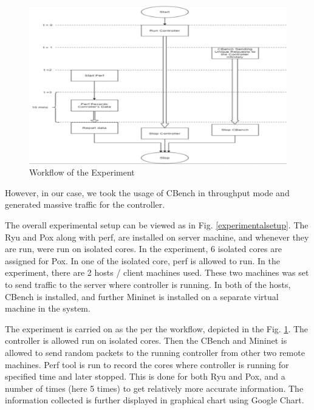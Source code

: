 \begin{figure}[!hbt]
    \centering
        \includegraphics[width=\textwidth,keepaspectratio]{images/Workflow.PNG}
       \caption{Workflow of the Experiment}
        \label{workflowexperiment}
\end{figure}

However, in our case, we took the usage of CBench in throughput mode and generated massive traffic for the controller.

The overall experimental setup can be viewed as in Fig. \ref{experimentalsetup}. The Ryu and Pox along with perf, are installed on server machine, and whenever they are run, were run on isolated cores. In the experiment, 6 isolated cores are assigned for Pox. In one of the isolated core, perf is allowed to run. In the experiment, there are 2 hosts / client machines used. These two machines was set to send traffic to the server where controller is running. In both of the hosts, CBench is installed, and further Mininet is installed on a separate virtual machine in the system.

The experiment is carried on as the per the workflow, depicted in the Fig. \ref{workflowexperiment}. The controller is allowed run on isolated cores. Then the CBench and Mininet is allowed to send random packets to the running controller from other two remote machines. Perf tool is run to record the cores where controller is running for specified time and later stopped. This is done for both Ryu and Pox, and a number of times (here 5 times) to get relatively more accurate information. The information collected is further displayed in graphical chart using Google Chart.